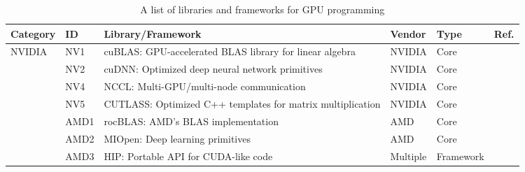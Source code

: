 
\begin{table*}[htbp]
	\centering
	\caption{A list of libraries and frameworks for GPU programming}
	\label{tab:gpu_papers}
	\begin{tabular}{llp{8cm}lll}
		\hline
		\small \textbf{Category} & \small \textbf{ID} & \small \textbf{Library/Framework}                                                     & \small \textbf{Vendor} & \small \textbf{Type} & \small \textbf{Ref.}                                  \\
		\hline
		\multirow{5}{*}{\small NVIDIA}
		                         & \small NV1         & \small cuBLAS: GPU-accelerated BLAS library for linear algebra                        & \small NVIDIA          & \small Core          & \small \cite{noauthor_cublas_nodate}                  \\[1ex]
		                         & \small NV2         & \small cuDNN: Optimized deep neural network primitives                                & \small NVIDIA          & \small Core          & \small \cite{chetlur_cudnn_2014}                      \\[1ex]
		                         & \small NV4         & \small NCCL: Multi-GPU/multi-node communication                                       & \small NVIDIA          & \small Core          & \small \cite{noauthor_nvidianccl_2025}                \\[1ex]
		                         & \small NV5         & \small CUTLASS: Optimized C++ templates for matrix multiplication                     & \small NVIDIA          & \small Core          & \small \cite{thakkar_cutlass_2023}                    \\
		\hline
		\multirow{5}{*}{\small AMD}
		                         & \small AMD1        & \small rocBLAS: AMD's BLAS implementation                                             & \small AMD             & \small Core          & \small \cite{noauthor_rocmrocblas_2025}               \\[1ex]
		                         & \small AMD2        & \small MIOpen: Deep learning primitives                                               & \small AMD             & \small Core          & \small \cite{noauthor_rocmmiopen_2025}                \\[1ex]
		                         & \small AMD3        & \small HIP: Portable API for CUDA-like code                                           & \small Multiple        & \small Framework     & \small \cite{noauthor_rocmhip_2025}                   \\[1ex]

\end{tabular}
\end{table*}

